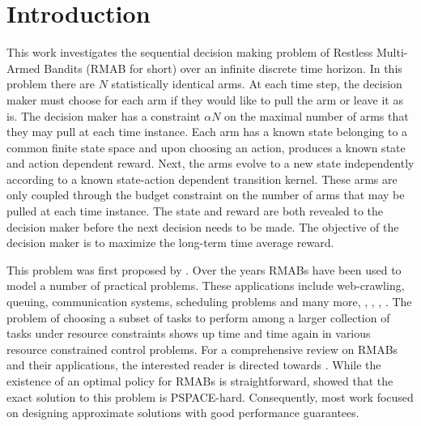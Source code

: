 
\section{Introduction}
This work investigates the sequential decision making problem of Restless Multi-Armed Bandits (RMAB for short) over an infinite discrete time horizon. In this problem there are $N$ statistically identical arms. At each time step, the decision maker must choose for each arm if they would like to pull the arm or leave it as is. The decision maker has a constraint $\alpha N$ on the maximal number of arms that they may pull at each time instance. Each arm has a known state belonging to a common finite state space and upon choosing an action, produces a known state and action dependent reward. Next, the arms evolve to a new state independently according to a known state-action dependent transition kernel. These arms are only coupled through the budget constraint on the number of arms that may be pulled at each time instance. The state and reward are both revealed to the decision maker before the next decision needs to be made. The objective of the decision maker is to maximize the long-term time average reward.

This problem was first proposed by \citet{Wh88}. Over the years RMABs have been used to model a number of practical problems. These applications include web-crawling, queuing, communication systems, scheduling problems and many more, \citep{veatch1996scheduling}, \citep{dance2019optimal}, \citep{nino2002dynamic}, \citep{MearaWebcrawl01}. The problem of choosing a subset of tasks to perform among a larger collection of tasks under resource constraints shows up time and time again in various resource constrained control problems. For a comprehensive review on RMABs and their applications, the interested reader is directed towards \citet{NinoMora23}. While the existence of an optimal policy for RMABs is straightforward, \citet{PT99} showed that the exact solution to this problem is PSPACE-hard. Consequently, most work focused on designing approximate solutions with good performance guarantees. 

